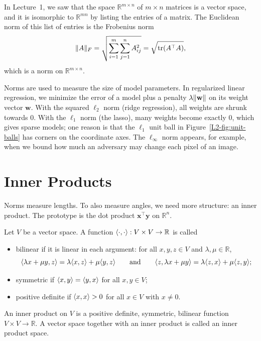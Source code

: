 \begin{example}
    In Lecture~1, we saw that the space $\mathbb{R}^{m \times n}$ of $m \times n$ matrices is a vector space, and it is isomorphic to $\mathbb{R}^{mn}$ by listing the entries of a matrix. The Euclidean norm of this list of entries is the Frobenius norm
    \[\lVert A \rVert_F = \sqrt{\sum_{i=1}^m \sum_{j=1}^n A_{ij}^2} = \sqrt{\operatorname{tr}(A^\top A)},\]
    which is a norm on $\mathbb{R}^{m \times n}$.
\end{example}

\begin{remark}
    Norms are used to measure the size of model parameters. In regularized linear regression, we minimize the error of a model plus a penalty $\lambda \lVert \mathbf{w} \rVert$ on its weight vector $\mathbf{w}$. With the squared $\ell_2$ norm (ridge regression), all weights are shrunk towards $0$. With the $\ell_1$ norm (the lasso), many weights become exactly $0$, which gives sparse models; one reason is that the $\ell_1$ unit ball in Figure~\ref{L2-fig:unit-balls} has corners on the coordinate axes. The $\ell_\infty$ norm appears, for example, when we bound how much an adversary may change each pixel of an image.
\end{remark}

\section{Inner Products}

Norms measure lengths. To also measure angles, we need more structure: an inner product. The prototype is the dot product $\mathbf{x}^\top \mathbf{y}$ on $\mathbb{R}^n$.

\begin{definition}\label{L2-def:inner-product}
    Let $V$ be a vector space. A function $\langle \cdot, \cdot \rangle: V \times V \to \mathbb{R}$ is called
    \begin{itemize}
        \item bilinear if it is linear in each argument: for all $x, y, z \in V$ and $\lambda, \mu \in \mathbb{R}$,
        \[\langle \lambda x + \mu y, z \rangle = \lambda \langle x, z \rangle + \mu \langle y, z \rangle \qquad \text{and} \qquad \langle z, \lambda x + \mu y \rangle = \lambda \langle z, x \rangle + \mu \langle z, y \rangle;\]
        \item symmetric if $\langle x, y \rangle = \langle y, x \rangle$ for all $x, y \in V$;
        \item positive definite if $\langle x, x \rangle > 0$ for all $x \in V$ with $x \neq 0$.
    \end{itemize}
    An inner product on $V$ is a positive definite, symmetric, bilinear function $V \times V \to \mathbb{R}$. A vector space together with an inner product is called an inner product space.
\end{definition}

